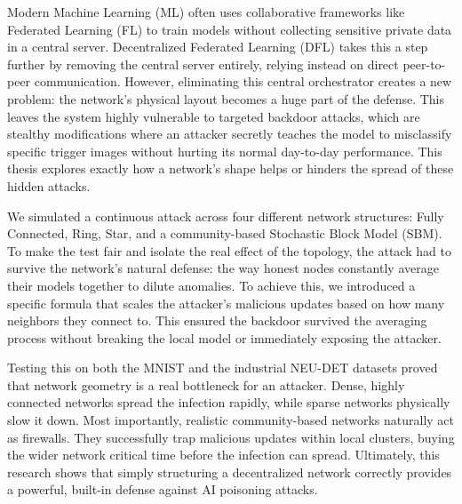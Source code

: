 Modern Machine Learning (ML) often uses collaborative frameworks like Federated Learning (FL) to train models without collecting sensitive private data in a central server. Decentralized Federated Learning (DFL) takes this a step further by removing the central server entirely, relying instead on direct peer-to-peer communication. However, eliminating this central orchestrator creates a new problem: the network's physical layout becomes a huge part of the defense. This leaves the system highly vulnerable to targeted backdoor attacks, which are stealthy modifications where an attacker secretly teaches the model to misclassify specific trigger images without hurting its normal day-to-day performance. This thesis explores exactly how a network's shape helps or hinders the spread of these hidden attacks. 

We simulated a continuous attack across four different network structures: Fully Connected, Ring, Star, and a community-based Stochastic Block Model (SBM). To make the test fair and isolate the real effect of the topology, the attack had to survive the network's natural defense: the way honest nodes constantly average their models together to dilute anomalies. To achieve this, we introduced a specific formula that scales the attacker's malicious updates based on how many neighbors they connect to. This ensured the backdoor survived the averaging process without breaking the local model or immediately exposing the attacker. 

Testing this on both the MNIST and the industrial NEU-DET datasets proved that network geometry is a real bottleneck for an attacker. Dense, highly connected networks spread the infection rapidly, while sparse networks physically slow it down. Most importantly, realistic community-based networks naturally act as firewalls. They successfully trap malicious updates within local clusters, buying the wider network critical time before the infection can spread. Ultimately, this research shows that simply structuring a decentralized network correctly provides a powerful, built-in defense against AI poisoning attacks.
